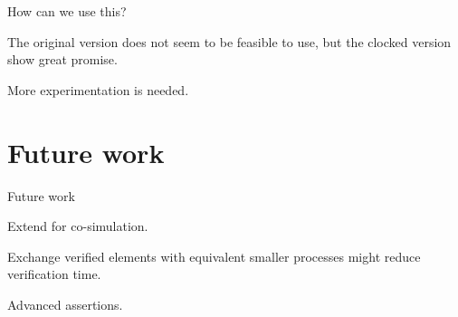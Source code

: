 \documentclass[11pt]{beamer}
\begin{document}
%
%
%

%
\begin{frame}{How can we use this?}

\begin{block}{}
The original version does not seem to be feasible to use, but the clocked version show great promise.
\end{block}

\pause

\begin{block}{}
More experimentation is needed.
\end{block}

\end{frame}


\section{Future work}
%
\begin{frame}{Future work}



\begin{block}{}
Extend for co-simulation.
\end{block}

\pause

\begin{block}{}
Exchange verified elements with equivalent smaller processes might reduce verification time.
\end{block}

\pause

\begin{block}{}
Advanced assertions.
\end{block}



\end{frame}
\end{document}

